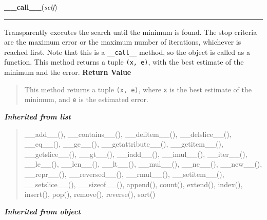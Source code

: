    \label{peach:pso:base:ParticleSwarmOptimizer:__call__}

    \vspace{0.5ex}

\hspace{.8\funcindent}\begin{boxedminipage}{\funcwidth}

    \raggedright \textbf{\_\_call\_\_}(\textit{self})

    \vspace{-1.5ex}

    \rule{\textwidth}{0.5\fboxrule}
\setlength{\parskip}{2ex}

Transparently executes the search until the minimum is found. The stop
criteria are the maximum error or the maximum number of iterations,
whichever is reached first. Note that this is a \texttt{\_\_call\_\_} method, so
the object is called as a function. This method returns a tuple
\texttt{(x, e)}, with the best estimate of the minimum and the error.
\setlength{\parskip}{1ex}
      \textbf{Return Value}
    \vspace{-1ex}

      \begin{quote}

This method returns a tuple \texttt{(x, e)}, where \texttt{x} is the best
estimate of the minimum, and \texttt{e} is the estimated error.
      \end{quote}

    \end{boxedminipage}


\large{\textbf{\textit{Inherited from list}}}

\begin{quote}
\_\_add\_\_(), \_\_contains\_\_(), \_\_delitem\_\_(), \_\_delslice\_\_(), \_\_eq\_\_(), \_\_ge\_\_(), \_\_getattribute\_\_(), \_\_getitem\_\_(), \_\_getslice\_\_(), \_\_gt\_\_(), \_\_iadd\_\_(), \_\_imul\_\_(), \_\_iter\_\_(), \_\_le\_\_(), \_\_len\_\_(), \_\_lt\_\_(), \_\_mul\_\_(), \_\_ne\_\_(), \_\_new\_\_(), \_\_repr\_\_(), \_\_reversed\_\_(), \_\_rmul\_\_(), \_\_setitem\_\_(), \_\_setslice\_\_(), \_\_sizeof\_\_(), append(), count(), extend(), index(), insert(), pop(), remove(), reverse(), sort()
\end{quote}

\large{\textbf{\textit{Inherited from object}}}

